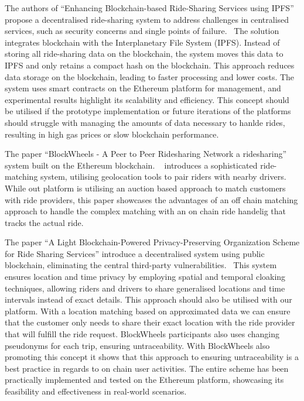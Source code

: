 The authors of ``Enhancing Blockchain-based Ride-Sharing Services using IPFS''  propose a decentralised ride-sharing system to address challenges in centralised services, such as security concerns and single points of failure.~\cite{Mahmoud.2022}  The solution integrates blockchain with the Interplanetary File System (IPFS). Instead of storing all ride-sharing data on the blockchain, the system moves this data to IPFS and only retains a compact hash on the blockchain. This approach reduces data storage on the blockchain, leading to faster processing and lower costs. The system uses smart contracts on the Ethereum platform for management, and experimental results highlight its scalability and efficiency. This concept should be utilised if the prototype implementation or future iterations of the platforms should struggle with managing the amounts of data necessary to hanlde rides, resulting in high gas prices or slow blockchain performance.


The paper ``BlockWheels - A Peer to Peer Ridesharing Network a ridesharing'' system built on the Ethereum blockchain. ~\cite{Joseph.} introduces a sophisticated ride-matching system, utilising geolocation tools to pair riders with nearby drivers. While out platform is utilising an auction based approach to match customers with ride providers, this paper showcases the advantages of an off chain matching approach to handle the complex matching with an on chain ride handelig that tracks the actual ride.

The paper ``A Light Blockchain-Powered Privacy-Preserving Organization Scheme for Ride Sharing Services'' introduce a decentralised system using public blockchain, eliminating the central third-party vulnerabilities.~\cite{Baza.52520205282020} This system ensures location and time privacy by employing spatial and temporal cloaking techniques, allowing riders and drivers to share generalised locations and time intervals instead of exact details. This approach should also be utilised with our platform. With a location matching based on approximated data we can ensure that the customer only needs to share their exact location with the ride provider that will fulfill the ride request.
BlockWheels participants also uses changing pseudonyms for each trip, ensuring untraceability. With BlockWheels also promoting this concept it shows that this approach to ensuring untraceability is a best practice in regards to on chain user activities. The entire scheme has been practically implemented and tested on the Ethereum platform, showcasing its feasibility and effectiveness in real-world scenarios.

